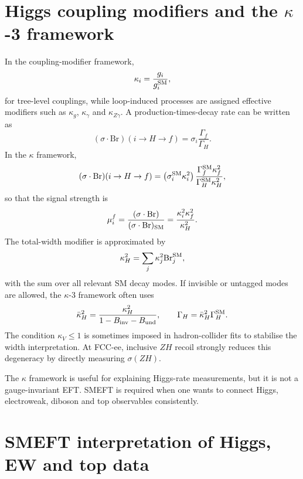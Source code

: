 \documentclass[11pt,a4paper]{report}
\newcommand{\br}{\mathrm{Br}}
\begin{document}
\section{Higgs coupling modifiers and the $\kappa$-3 framework}

In the coupling-modifier framework,
\begin{equation}
  \kappa_i=\frac{g_i}{g_i^{\rm SM}},
\end{equation}
for tree-level couplings, while loop-induced processes are assigned effective modifiers such as $\kappa_g$, $\kappa_\gamma$ and $\kappa_{Z\gamma}$.  A production-times-decay rate can be written as
\begin{equation}
  (\sigma\cdot \br)(i\to H\to f)=\sigma_i\frac{\Gamma_f}{\Gamma_H}.
\end{equation}
In the $\kappa$ framework,
\begin{equation}
  (\sigma\cdot \br)(i\to H\to f)
  =\left(\sigma_i^{\rm SM}\kappa_i^2\right)
  \frac{\Gamma_f^{\rm SM}\kappa_f^2}{\Gamma_H^{\rm SM}\kappa_H^2},
\end{equation}
so that the signal strength is
\begin{equation}
  \mu_i^f=\frac{(\sigma\cdot \br)}{(\sigma\cdot \br)_{\rm SM}}
  =\frac{\kappa_i^2\kappa_f^2}{\kappa_H^2}.
\end{equation}
The total-width modifier is approximated by
\begin{equation}
  \kappa_H^2=\sum_j \kappa_j^2\br_j^{\rm SM},
\end{equation}
with the sum over all relevant SM decay modes.  If invisible or untagged modes are allowed, the $\kappa$-3 framework often uses
\begin{equation}
  \bar\kappa_H^2=\frac{\kappa_H^2}{1-B_{\rm inv}-B_{\rm und}},
  \qquad
  \Gamma_H=\bar\kappa_H^2\Gamma_H^{\rm SM}.
\end{equation}
The condition $\kappa_V\leq1$ is sometimes imposed in hadron-collider fits to stabilise the width interpretation.  At FCC-ee, inclusive $ZH$ recoil strongly reduces this degeneracy by directly measuring $\sigma(ZH)$.

\begin{warningbox}
The $\kappa$ framework is useful for explaining Higgs-rate measurements, but it is not a gauge-invariant EFT.  SMEFT is required when one wants to connect Higgs, electroweak, diboson and top observables consistently.
\end{warningbox}

\section{SMEFT interpretation of Higgs, EW and top data}
\end{document}
